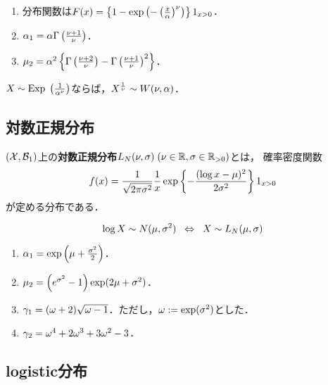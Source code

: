 \documentclass[uplatex,dvipdfmx]{jsreport}
\begin{document}
\begin{proposition}\mbox{}
    \begin{enumerate}
        \item 分布関数は$F(x)=\left\{1-\exp\left(-\left(\frac{x}{\alpha}\right)^\nu\right)\right\}1_{x>0}$．
        \item $\alpha_1=\alpha\Gamma\left(\frac{\nu+1}{\nu}\right)$．
        \item $\mu_2=\alpha^2\left\{\Gamma\left(\frac{\nu+2}{\nu}\right)-\Gamma\left(\frac{\nu+1}{\nu}\right)^2\right\}$．
    \end{enumerate}
\end{proposition}

\begin{proposition}
    $X\sim\mathrm{Exp}\;\left(\frac{1}{\alpha^\nu}\right)$ならば，$X^{\frac{1}{\nu}}\sim W(\nu,\alpha)$．
\end{proposition}

\subsection{対数正規分布}

\begin{definition}
    $(\mathcal{X},\mathcal{B}_1)$上の\textbf{対数正規分布}$L_N(\nu,\sigma)\;(\nu\in\mathbb{R},\sigma\in\mathbb{R}_{>0})$とは，
    確率密度関数
    \[f(x)=\frac{1}{\sqrt{2\pi\sigma^2}}\frac{1}{x}\exp\left\{-\frac{(\log x-\mu)^2}{2\sigma^2}\right\}1_{x>0}\]
    が定める分布である．
\end{definition}

\begin{proposition}
    \[\log X\sim N(\mu,\sigma^2)\;\;\Leftrightarrow\;\; X\sim L_N(\mu,\sigma)\]
\end{proposition}

\begin{proposition}\mbox{}
    \begin{enumerate}
        \item $\alpha_1=\exp\left(\mu+\frac{\sigma^2}{2}\right)$．
        \item $\mu_2=\left(e^{\sigma^2}-1\right)\exp(2\mu+\sigma^2)$．
        \item $\gamma_1=(\omega+2)\sqrt{\omega-1}$．ただし，$\omega:=\exp(\sigma^2)$とした．
        \item $\gamma_2=\omega^4+2\omega^3+3\omega^2-3$．
    \end{enumerate}
\end{proposition}

\subsection{logistic分布}
\end{document}
